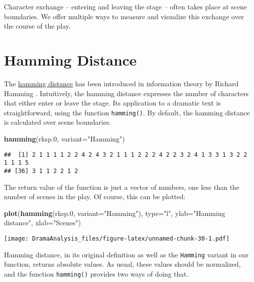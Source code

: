 \documentclass[]{book}
\newenvironment{Shaded}{\begin{snugshade}}{\end{snugshade}}
\newcommand{\DataTypeTok}[1]{\textcolor[rgb]{0.13,0.29,0.53}{#1}}
\newcommand{\FloatTok}[1]{\textcolor[rgb]{0.00,0.00,0.81}{#1}}
\newcommand{\KeywordTok}[1]{\textcolor[rgb]{0.13,0.29,0.53}{\textbf{#1}}}
\newcommand{\NormalTok}[1]{#1}
\newcommand{\StringTok}[1]{\textcolor[rgb]{0.31,0.60,0.02}{#1}}
\begin{document}
Character exchange -- entering and leaving the stage -- often takes place at scene boundaries. We offer multiple ways to measure and visualize this exchange over the course of the play.

\hypertarget{hamming-distance}{%
\section{Hamming Distance}\label{hamming-distance}}

The \href{https://en.wikipedia.org/wiki/Hamming_distance}{hamming distance} has been introduced in information theory by Richard Hamming \citep{Hamming:1950aa}. Intuitively, the hamming distance expresses the number of characters that either enter or leave the stage. Its application to a dramatic text is straightforward, using the function \texttt{hamming()}. By default, the hamming distance is calculated over scene boundaries.

\begin{Shaded}
\begin{Highlighting}[]
\KeywordTok{hamming}\NormalTok{(rksp}\FloatTok{.0}\NormalTok{, }\DataTypeTok{variant=}\StringTok{"Hamming"}\NormalTok{)}
\end{Highlighting}
\end{Shaded}

\begin{verbatim}
##  [1] 2 1 1 1 1 2 2 4 2 4 3 2 1 1 1 2 2 2 4 2 2 3 2 4 1 3 3 1 3 2 2 1 1 1 5
## [36] 3 1 1 2 2 1 2
\end{verbatim}

The return value of the function is just a vector of numbers, one less than the number of scenes in the play. Of course, this can be plotted:

\begin{Shaded}
\begin{Highlighting}[]
\KeywordTok{plot}\NormalTok{(}\KeywordTok{hamming}\NormalTok{(rksp}\FloatTok{.0}\NormalTok{, }\DataTypeTok{variant=}\StringTok{"Hamming"}\NormalTok{),}
     \DataTypeTok{type=}\StringTok{"l"}\NormalTok{,}
     \DataTypeTok{ylab=}\StringTok{"Hamming distance"}\NormalTok{,}
     \DataTypeTok{xlab=}\StringTok{"Scenes"}\NormalTok{)}
\end{Highlighting}
\end{Shaded}

\texttt{[image: DramaAnalysis\_files/figure-latex/unnamed-chunk-30-1.pdf]}

Hamming distance, in its original definition as well as the \texttt{Hamming} variant in our function, returns absolute values. As usual, these values should be normalized, and the function \texttt{hamming()} provides two ways of doing that.
\end{document}

